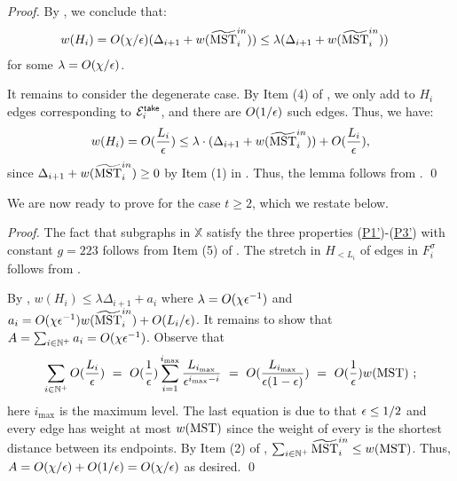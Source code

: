 \begin{proof}
	By , we conclude that:
	\begin{equation}\label{eq:Hi-nondegenT2}
		\begin{split}
			w(H_i) &=  O(\chi/\epsilon) (\Delta_{i+1} + w(\widetilde{\mathrm{MST}}^{in}_i)) \leq \lambda(\Delta_{i+1} + w(\widetilde{\mathrm{MST}}^{in}_i))
		\end{split}
	\end{equation} 
	for some $\lambda =  O(\chi/\epsilon) $.
	
	
	It remains to consider the degenerate case. By Item (4) of , we only add to $H_i$ edges corresponding to $\mathcal{E}^{\mathsf{take}}_i$, and there are $O(1/\epsilon)$ such edges. Thus, we have:
	\begin{equation}\label{eq:Hi-degenT2}
		w(H_i) = O(\frac{L_i}{\epsilon}) \leq  \lambda\cdot (\Delta_{i+1} + w(\widetilde{\mathrm{MST}}^{in}_i)) + O(\frac{L_i}{\epsilon}), 
	\end{equation} 
since $\Delta_{i+1} + w(\widetilde{\mathrm{MST}}^{in}_i) \geq 0$ by Item (1) in . Thus, the lemma follows from . \qed
\end{proof}

We are now ready to prove  for the case $t\geq 2$, which we restate below.

\HiConstruction*
\begin{proof} The fact that subgraphs in $\mathbb{X}$ satisfy the three properties (\hyperlink{P1'}{P1'})-(\hyperlink{P3'}{P3'}) with constant $g=223$ follows from Item (5) of .  The stretch in $H_{< L_i}$ of edges in $F^{\sigma}_{i}$ follows from .
	
	By  , $w(H_i) \leq \lambda \Delta_{i+1} + a_i$ where  $\lambda = O(\chi \epsilon^{-1} )$  and $a_i =   O(\chi \epsilon^{-1} )w(\widetilde{\mathrm{MST}}^{in}_i) + O(L_i/\epsilon)$. It remains to show that $A = \sum_{i\in \mathbb{N}^+}a_i = O(\chi \epsilon^{-1} )$.  Observe that
	\begin{equation*}
		\sum_{i\in \mathbb{N}^+}O(\frac{L_i}{\epsilon}) ~=~  O(\frac{1}{\epsilon}) \sum_{i=1}^{i_{\max}} \frac{L_{i_{\max}}}{\epsilon^{i_{\max}-i}} ~=~ O(\frac{L_{i_{\max}}}{\epsilon(1-\epsilon)}) ~=~ O(\frac{1}{\epsilon}) w(\mathrm{MST})~;
	\end{equation*}
	here $i_{\max}$ is the maximum level. The last equation is due to that $\epsilon \leq 1/2$  and every edge has weight at most $w(\mathrm{MST})$ since the weight of every is the shortest distance between its endpoints. By Item (2) of ,  $\sum_{i\in \mathbb{N}^+} \widetilde{\mathrm{MST}}^{in}_i\leq w(\mathrm{MST})$.  Thus, $A = O(\chi/\epsilon) + O(1/\epsilon) = O(\chi /\epsilon)$ as desired.   \qed
\end{proof}


